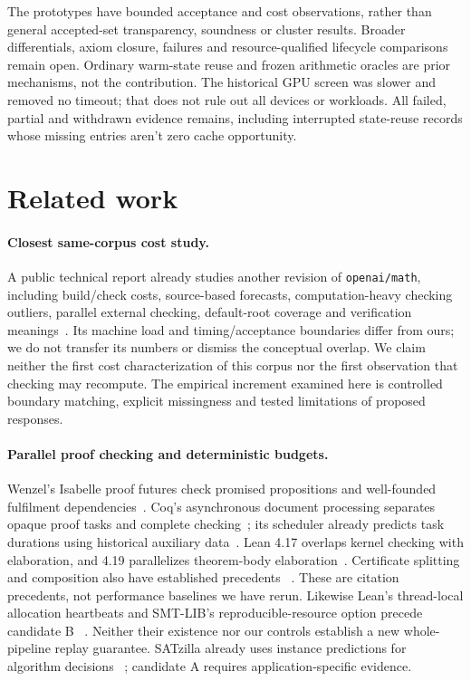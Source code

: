 \documentclass[10pt,twocolumn]{article}
\begin{document}
The prototypes have bounded acceptance and cost observations, rather than
general accepted-set transparency, soundness or cluster results.
Broader differentials, axiom closure, failures and resource-qualified lifecycle
comparisons remain open. Ordinary warm-state reuse and frozen arithmetic oracles
are prior mechanisms, not the contribution.
The historical GPU screen was slower and removed no timeout; that does not
rule out all devices or workloads.
All failed, partial and withdrawn evidence remains, including interrupted
state-reuse records whose missing entries aren't zero cache opportunity.

\section{Related work}
\paragraph{Closest same-corpus cost study.}
A public technical report already studies another revision of
\texttt{openai/math}, including build/check costs, source-based forecasts,
computation-heavy checking outliers, parallel external checking, default-root
coverage and verification meanings~\cite{openaiMathTooling2026}.
Its machine load and timing/acceptance boundaries differ from ours; we
do not transfer its numbers or dismiss the conceptual overlap.
We claim neither the first cost characterization of this corpus nor
the first observation that checking may recompute.
The empirical increment examined here is controlled boundary matching,
explicit missingness and tested limitations of proposed responses.


\paragraph{Parallel proof checking and deterministic budgets.}
Wenzel's Isabelle proof futures check promised propositions and
well-founded fulfilment dependencies~\cite{wenzelParallel2009}.
Coq's asynchronous document processing separates opaque proof tasks and
complete checking~\cite{coqAsync2015}; its scheduler already predicts task
durations using historical auxiliary data~\cite{coqAsyncManual2023}.
Lean 4.17 overlaps kernel checking with elaboration, and 4.19 parallelizes
theorem-body elaboration~\cite{leanParallelRelease2025,leanKernelParallel2025}.
Certificate splitting and composition also have established precedents
~\cite{selfCertification2012}.
These are citation precedents, not performance baselines we have rerun.
Likewise Lean's thread-local allocation heartbeats and SMT-LIB's
reproducible-resource option precede candidate B
~\cite{leanHeartbeats2026,smtlib27}. Neither their existence nor our controls
establish a new whole-pipeline replay guarantee.
SATzilla already uses instance predictions for algorithm decisions
~\cite{satzilla2008}; candidate A requires application-specific evidence.
\end{document}
